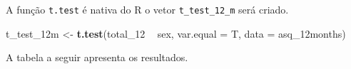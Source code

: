 \documentclass[
]{book}
\newenvironment{Shaded}{\begin{snugshade}}{\end{snugshade}}
\newcommand{\DataTypeTok}[1]{\textcolor[rgb]{0.13,0.29,0.53}{#1}}
\newcommand{\DecValTok}[1]{\textcolor[rgb]{0.00,0.00,0.81}{#1}}
\newcommand{\KeywordTok}[1]{\textcolor[rgb]{0.13,0.29,0.53}{\textbf{#1}}}
\newcommand{\NormalTok}[1]{#1}
\newcommand{\OperatorTok}[1]{\textcolor[rgb]{0.81,0.36,0.00}{\textbf{#1}}}
\newcommand{\OtherTok}[1]{\textcolor[rgb]{0.56,0.35,0.01}{#1}}
\newcommand{\StringTok}[1]{\textcolor[rgb]{0.31,0.60,0.02}{#1}}
\begin{document}
A função \texttt{t.test} é nativa do R o vetor \texttt{t\_test\_12\_m} será criado.

\begin{Shaded}
\begin{Highlighting}[]
\NormalTok{t_test_12m <-}\StringTok{ }\KeywordTok{t.test}\NormalTok{(total_}\DecValTok{12} \OperatorTok{~}\StringTok{ }\NormalTok{sex, }\DataTypeTok{var.equal =}\NormalTok{ T, }\DataTypeTok{data =}\NormalTok{ asq_12months)}
\end{Highlighting}
\end{Shaded}

A tabela a seguir apresenta os resultados.

\begin{Shaded}
\end{Shaded}
\end{document}
